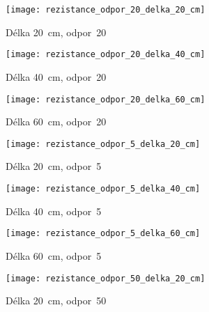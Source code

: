\begin{figure}[h]
	\label{img:pic_rezistance_odpor_20_delka_20_cm}
	\begin{center}
		\texttt{[image: rezistance\_odpor\_20\_delka\_20\_cm]}
		\caption{Délka 20~cm, odpor~20}
	\end{center}
\end{figure}


\begin{figure}[h]
	\label{img:pic_rezistance_odpor_20_delka_40_cm}
	\begin{center}
		\texttt{[image: rezistance\_odpor\_20\_delka\_40\_cm]}
		\caption{Délka 40~cm, odpor~20}
	\end{center}
\end{figure}

\begin{figure}[h]
	\label{img:pic_rezistance_odpor_20_delka_60_cm}
	\begin{center}
		\texttt{[image: rezistance\_odpor\_20\_delka\_60\_cm]}
		\caption{Délka 60~cm, odpor~20}
	\end{center}
\end{figure}

\begin{figure}[h]
	\label{img:pic_rezistance_odpor_5_delka_20_cm}
	\begin{center}
		\texttt{[image: rezistance\_odpor\_5\_delka\_20\_cm]}
		\caption{Délka 20~cm, odpor~5}
	\end{center}
\end{figure}

\begin{figure}[h]
	\label{img:pic_rezistance_odpor_5_delka_40_cm}
	\begin{center}
		\texttt{[image: rezistance\_odpor\_5\_delka\_40\_cm]}
		\caption{Délka 40~cm, odpor~5}
	\end{center}
\end{figure}

\begin{figure}[h]
	\label{img:pic_rezistance_odpor_5_delka_60_cm}
	\begin{center}
		\texttt{[image: rezistance\_odpor\_5\_delka\_60\_cm]}
		\caption{Délka 60~cm, odpor~5}
	\end{center}
\end{figure}

\begin{figure}[h]
	\label{img:pic_rezistance_odpor_50_delka_20_cm}
	\begin{center}
		\texttt{[image: rezistance\_odpor\_50\_delka\_20\_cm]}
		\caption{Délka 20~cm, odpor~50}
	\end{center}
\end{figure}


